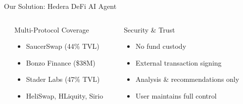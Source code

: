 \documentclass[aspectratio=169]{beamer}
\providecommand{\faShieldAlt}{\faLock}
\begin{document}
\begin{frame}{Our Solution: Hedera DeFi AI Agent}
\begin{columns}[c]
\begin{center}
\end{center}

\vspace{0.05cm}

\begin{block}{Multi-Protocol Coverage}
\vspace{0.05cm}
\begin{itemize}
\setlength\itemsep{-0.1em}
\setlength\leftmargin{1em}
\item[\color{success}\faCheckCircle] SaucerSwap (44\% TVL)
\item[\color{success}\faCheckCircle] Bonzo Finance (\$38M)
\item[\color{success}\faCheckCircle] Stader Labs (47\% TVL)
\item[\color{success}\faCheckCircle] HeliSwap, HLiquity, Sirio
\end{itemize}
\vspace{0.05cm}
\end{block}

\begin{center}
\end{center}

\vspace{0.05cm}

\begin{block}{Security \& Trust}
\vspace{0.05cm}
\begin{itemize}
\setlength\itemsep{-0.1em}
\setlength\leftmargin{1em}
\item[\color{primary}\faLock] No fund custody
\item[\color{primary}\faSignature] External transaction signing
\item[\color{primary}\faChartPie] Analysis \& recommendations only
\item[\color{primary}\faUserShield] User maintains full control
\end{itemize}
\vspace{0.05cm}
\end{block}
\end{columns}
\end{frame}
\end{document}
